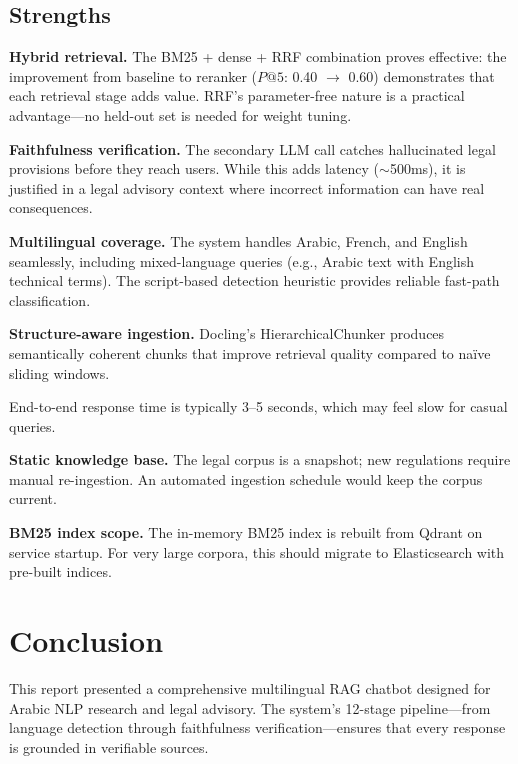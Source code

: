 \documentclass[12pt, a4paper]{article}
\begin{document}
\subsection{Strengths}

\textbf{Hybrid retrieval.} The BM25 + dense + RRF combination proves
effective: the improvement from baseline to reranker ($P@5$: 0.40 $\to$
0.60) demonstrates that each retrieval stage adds value. RRF's parameter-free
nature is a practical advantage---no held-out set is needed for weight tuning.

\textbf{Faithfulness verification.} The secondary LLM call catches
hallucinated legal provisions before they reach users. While this adds
latency ($\sim$500ms), it is justified in a legal advisory context where
incorrect information can have real consequences.

\textbf{Multilingual coverage.} The system handles Arabic, French, and
English seamlessly, including mixed-language queries (e.g., Arabic text
with English technical terms). The script-based detection heuristic
provides reliable fast-path classification.

\textbf{Structure-aware ingestion.} Docling's HierarchicalChunker produces
semantically coherent chunks that improve retrieval quality compared to
na\"ive sliding windows.


End-to-end response time is typically 3--5 seconds, which may feel slow
for casual queries.

\textbf{Static knowledge base.} The legal corpus is a snapshot; new
regulations require manual re-ingestion. An automated ingestion schedule
would keep the corpus current.

\textbf{BM25 index scope.} The in-memory BM25 index is rebuilt from
Qdrant on service startup. For very large corpora, this should migrate
to Elasticsearch with pre-built indices.


\section{Conclusion}

This report presented a comprehensive multilingual RAG chatbot designed
for Arabic NLP research and legal advisory. The system's 12-stage
pipeline---from language detection through faithfulness verification---ensures
that every response is grounded in verifiable sources.
\end{document}
